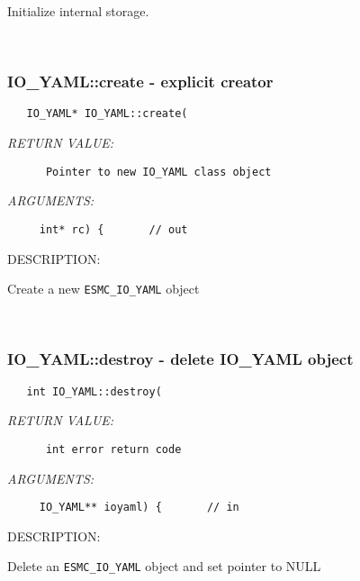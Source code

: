         Initialize internal storage.
   
 
\mbox{}\hrulefill\
 
\subsubsection [IO\_YAML::create] {IO\_YAML::create - explicit creator}


  
\begin{verbatim}   IO_YAML* IO_YAML::create(\end{verbatim}{\em RETURN VALUE:}
\begin{verbatim}      Pointer to new IO_YAML class object\end{verbatim}{\em ARGUMENTS:}
\begin{verbatim}     int* rc) {       // out
 \end{verbatim}
{\sf DESCRIPTION:\\ }


        Create a new {\tt ESMC\_IO\_YAML} object
   
 
\mbox{}\hrulefill\
 
\subsubsection [IO\_YAML::destroy] {IO\_YAML::destroy - delete IO\_YAML object}


  
\begin{verbatim}   int IO_YAML::destroy(\end{verbatim}{\em RETURN VALUE:}
\begin{verbatim}      int error return code\end{verbatim}{\em ARGUMENTS:}
\begin{verbatim}     IO_YAML** ioyaml) {       // in
 \end{verbatim}
{\sf DESCRIPTION:\\ }


        Delete an {\tt ESMC\_IO\_YAML} object and set pointer to NULL
   
 
\mbox{}\hrulefill\
 
